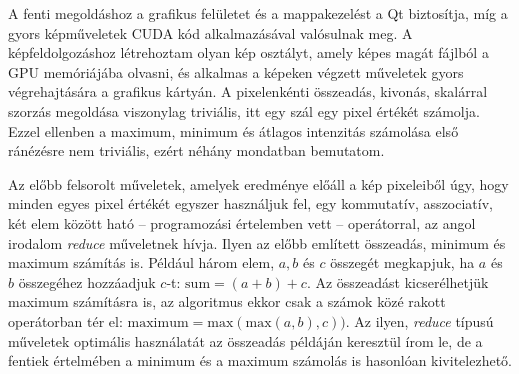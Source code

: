 \documentclass[a4paper,12pt]{article}
\begin{document}
A fenti megoldáshoz a grafikus felületet és a mappakezelést a Qt biztosítja, míg a gyors képműveletek CUDA kód alkalmazásával valósulnak meg. A képfeldolgozáshoz létrehoztam olyan kép osztályt, amely képes magát fájlból a GPU memóriájába olvasni, és alkalmas a képeken végzett műveletek gyors végrehajtására a grafikus kártyán. A pixelenkénti összeadás, kivonás, skalárral szorzás megoldása viszonylag triviális, itt egy szál egy pixel értékét számolja. Ezzel ellenben a maximum, minimum és átlagos intenzitás számolása első ránézésre nem triviális, ezért néhány mondatban bemutatom. 

Az előbb felsorolt műveletek, amelyek eredménye előáll a kép pixeleiből úgy, hogy minden egyes pixel értékét egyszer használjuk fel, egy kommutatív, asszociatív, két elem között ható -- programozási értelemben vett -- operátorral, az angol irodalom  \emph{reduce} műveletnek hívja. Ilyen az előbb említett összeadás, minimum és maximum számítás is. Például három elem, $a,b$ és $c$ összegét megkapjuk, ha $a$ és $b$ összegéhez hozzáadjuk $c$-t: $\text{sum} = (a+b)+c$. Az összeadást kicserélhetjük maximum számításra is, az algoritmus ekkor csak a számok közé rakott operátorban tér el: $\text{maximum} = \text{max} ( \text{max}(a,b),c))$.  Az ilyen, \emph{reduce} típusú műveletek optimális használatát az összeadás példáján keresztül írom le, de a fentiek értelmében a minimum és a maximum számolás is hasonlóan kivitelezhető.
\end{document}
